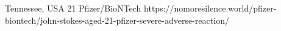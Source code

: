           {Tennessee, USA}
          {21}
          {Pfizer/BioNTech}
          {}
          {
          }
          {https://nomoresilence.world/pfizer-biontech/john-stokes-aged-21-pfizer-severe-adverse-reaction/}

                
